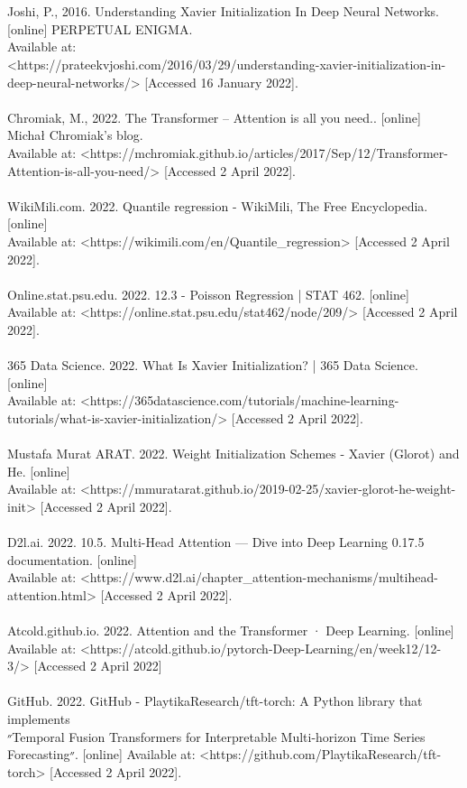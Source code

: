 \documentclass{article}
\begin{document}
\\\\
Joshi, P., 2016. Understanding Xavier Initialization In Deep Neural Networks. [online] PERPETUAL ENIGMA. \\Available at:
\\<https://prateekvjoshi.com/2016/03/29/understanding-xavier-initialization-in-deep-neural-networks/> [Accessed 16 January 2022].
\\\\
Chromiak, M., 2022. The Transformer – Attention is all you need.. [online] Michał Chromiak's blog.\\ Available at: <https://mchromiak.github.io/articles/2017/Sep/12/Transformer-Attention-is-all-you-need/> [Accessed 2 April 2022].
\\\\
WikiMili.com. 2022. Quantile regression - WikiMili, The Free Encyclopedia. [online]\\ Available at: <https://wikimili.com/en/Quantile_regression> [Accessed 2 April 2022].
\\\\
Online.stat.psu.edu. 2022. 12.3 - Poisson Regression | STAT 462. [online] \\Available at: <https://online.stat.psu.edu/stat462/node/209/> [Accessed 2 April 2022].
\\\\
365 Data Science. 2022. What Is Xavier Initialization? | 365 Data Science. [online]\\ Available at: <https://365datascience.com/tutorials/machine-learning-tutorials/what-is-xavier-initialization/> [Accessed 2 April 2022].
\\\\
Mustafa Murat ARAT. 2022. Weight Initialization Schemes - Xavier (Glorot) and He. [online]\\ Available at: <https://mmuratarat.github.io/2019-02-25/xavier-glorot-he-weight-init> [Accessed 2 April 2022].
\\\\
D2l.ai. 2022. 10.5. Multi-Head Attention — Dive into Deep Learning 0.17.5 documentation. [online]\\ Available at: <https://www.d2l.ai/chapter_attention-mechanisms/multihead-attention.html> [Accessed 2 April 2022].
\\\\
Atcold.github.io. 2022. Attention and the Transformer · Deep Learning. [online]\\ Available at: <https://atcold.github.io/pytorch-Deep-Learning/en/week12/12-3/> [Accessed 2 April 2022]
\\\\
GitHub. 2022. GitHub - PlaytikaResearch/tft-torch: A Python library that implements\\
״Temporal Fusion Transformers for Interpretable Multi-horizon Time Series Forecasting״.
[online] Available at: <https://github.com/PlaytikaResearch/tft-torch> [Accessed 2 April 2022].
\end{document}
